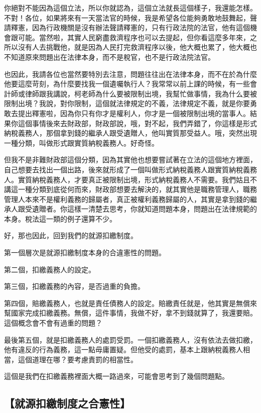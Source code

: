 \documentclass[oneside,sub3section]{ctexbook}
\begin{document}
你絕對不能因為這個立法，所以你就認為，這個立法就長這個樣子，我還能怎樣。不對！各位，如果將來有一天當法官的時候，我是希望各位能夠勇敢地鼓舞起，聲請釋憲，因為行政機關是沒有辦法聲請釋憲的，只有行政法院的法官，他有這個機會跟可能。當然啦，其實人民窮盡救濟程序也可以去提起，但你看這麼多年來，之所以沒有人去挑戰他，就是因為人民打完救濟程序以後，他大概也累了，他大概也不知道原來問題出在法律本身，而不是稅官，也不是行政法院法官。

也因此，我請各位也當然要特別去注意，問題往往出在法律本身，而不在於為什麼他要這麼苛刻，為什麼要找我一個遺囑執行人？我常常以前上課的時候，有一些會計師或律師跟我講說，柯老師為什么要被限制出境，我幫忙做事情，我為什么要被限制出境？我說，對你限制，這個就法律規定的不義，法律規定不義，就是你要勇敢去提出釋憲啦，因為你只有你才是權利人，你才是一個被限制出境的當事人。結果你這個事情後來去財政部，財政部說，哦，對不起，我們弄錯了，你這樣是形式納稅義務人，那個拿到錢的繼承人跟受遺贈人，他叫實質那受益人。哦，突然出現一種分類，叫做形式跟實質納稅義務人。好奇怪。

但我不是非難財政部這個分類，因為其實他也想要嘗試著在立法的這個地方裡面，自己想要去找出一個出路，後來就形成了一個叫做形式納稅義務人跟實質納稅義務人。實質納稅義務人，才要真正被限制出境，形式納稅義務人不需要。我們姑且不講這一種分類到底從何而來，財政部想要去解決的，就其實他是職務管理人，職務管理人本來不是權利義務的歸屬者，真正被權利義務歸屬的人，其實是拿到錢的繼承人跟受遺贈者。你這樣一清楚去思考，你就知道問題本身，問題出在法律規範的本身。稅法這一類的例子還算不少。

好，那也因此，回到我們的就源扣繳制度。

第一個層次是就源扣繳制度本身的合違憲性的問題。

第二個，扣繳義務人的設定。

第三個，扣繳義務的內容，是否過重的負擔。

第四個，賠繳義務人，也就是責任債務人的設定。賠繳責任就是，他其實是無償來幫國家完成扣繳義務。無償，這件事情，我做不好，拿不到錢就算了，我還要賠。這個概念會不會有過重的問題？

最後第五個，就是扣繳義務人的處罰受罰。一個扣繳義務人，沒有依法去做扣繳，他有違反的行為義務，這一點毋庸置疑。但他受的處罰，基本上跟納稅義務人相當，這個道理在哪？要考慮責罰的相當性。

這個是我們在扣繳義務裡面大概一路過來，可能會思考到了幾個問題點。

\hypertarget{ux5c31ux6e90ux6263ux7e73ux5236ux5ea6ux4e4bux5408ux61b2ux6027}{%
\subsection{【就源扣繳制度之合憲性】}\label{ux5c31ux6e90ux6263ux7e73ux5236ux5ea6ux4e4bux5408ux61b2ux6027}}
\end{document}
